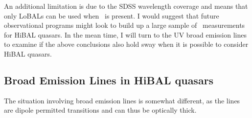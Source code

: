 An additional limitation is due to the SDSS wavelength coverage
and means that only LoBALs can be used when \ewo\ is present.
I would suggest that future observational programs might 
look to build up a large sample of \ewo\ measurements for HiBAL
quasars. In the mean time, I will turn to the UV broad emission
lines to examine if the above conclusions also hold sway
when it is possible to consider HiBAL quasars.

\subsection{Broad Emission Lines in HiBAL quasars}

The situation involving broad emission lines is somewhat different,
as the lines are dipole permitted transitions and can thus be optically
thick. 











